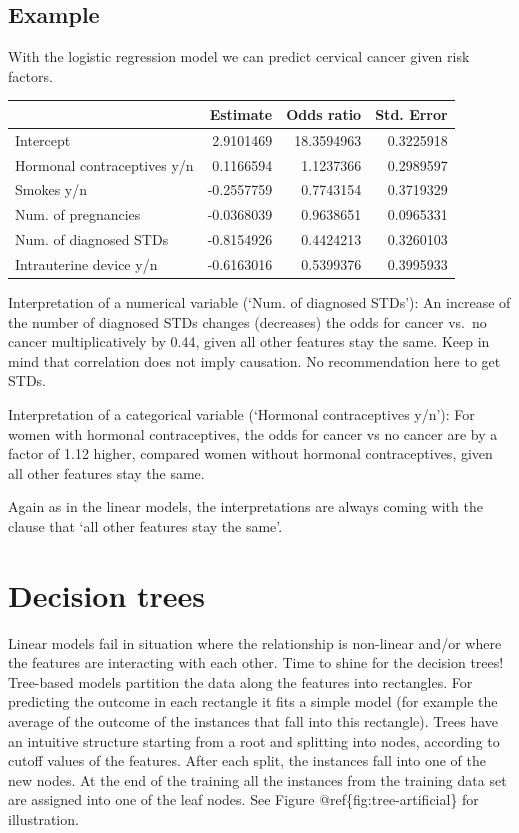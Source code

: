 \documentclass[12pt,]{krantz}
\theoremstyle{definition}
\theoremstyle{definition}
\theoremstyle{definition}
\theoremstyle{remark}
\begin{document}
\subsection{Example}\label{example}

With the logistic regression model we can predict cervical cancer given
risk factors.

\begin{tabular}{l|r|r|r}
\hline
  & Estimate & Odds ratio & Std. Error\\
\hline
Intercept & 2.9101469 & 18.3594963 & 0.3225918\\
\hline
Hormonal contraceptives y/n & 0.1166594 & 1.1237366 & 0.2989597\\
\hline
Smokes y/n & -0.2557759 & 0.7743154 & 0.3719329\\
\hline
Num. of pregnancies & -0.0368039 & 0.9638651 & 0.0965331\\
\hline
Num. of diagnosed STDs & -0.8154926 & 0.4424213 & 0.3260103\\
\hline
Intrauterine device y/n & -0.6163016 & 0.5399376 & 0.3995933\\
\hline
\end{tabular}

Interpretation of a numerical variable (`Num. of diagnosed STDs'): An
increase of the number of diagnosed STDs changes (decreases) the odds
for cancer vs.~no cancer multiplicatively by 0.44, given all other
features stay the same. Keep in mind that correlation does not imply
causation. No recommendation here to get STDs.

Interpretation of a categorical variable (`Hormonal contraceptives
y/n'): For women with hormonal contraceptives, the odds for cancer vs no
cancer are by a factor of 1.12 higher, compared women without hormonal
contraceptives, given all other features stay the same.

Again as in the linear models, the interpretations are always coming
with the clause that `all other features stay the same'.

\section{Decision trees}\label{decision-trees}

Linear models fail in situation where the relationship is non-linear
and/or where the features are interacting with each other. Time to shine
for the decision trees! Tree-based models partition the data along the
features into rectangles. For predicting the outcome in each rectangle
it fits a simple model (for example the average of the outcome of the
instances that fall into this rectangle). Trees have an intuitive
structure starting from a root and splitting into nodes, according to
cutoff values of the features. After each split, the instances fall into
one of the new nodes. At the end of the training all the instances from
the training data set are assigned into one of the leaf nodes. See
Figure @ref\{fig:tree-artificial\} for illustration.
\end{document}
